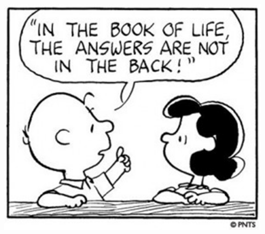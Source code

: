 \documentclass[two-side]{tufte-handout}
\begin{document}
\begin{marginfigure}%
	\begin{center}
		\includegraphics[width=1\linewidth]{ap-pic.png}
	\end{center}
\end{marginfigure}


\end{document}
